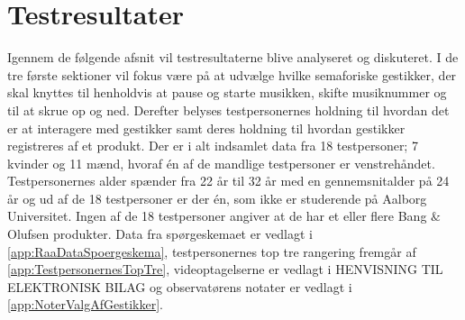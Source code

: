 \chapter{Testresultater}
\label{Testresultater}
%
Igennem de følgende afsnit vil testresultaterne blive analyseret og diskuteret. I de tre første sektioner vil fokus være på at udvælge hvilke semaforiske gestikker, der skal knyttes til henholdvis at pause og starte musikken, skifte musiknummer og til at skrue op og ned. Derefter belyses testpersonernes holdning til hvordan det er at interagere med gestikker samt deres holdning til hvordan gestikker registreres af et produkt.\blankline
%
Der er i alt indsamlet data fra 18 testpersoner; 7 kvinder og 11 mænd, hvoraf én af de mandlige testpersoner er venstrehåndet. Testpersonernes alder spænder fra 22 år til 32 år med en gennemsnitalder på 24 år og ud af de 18 testpersoner er der én, som ikke er studerende på Aalborg Universitet. Ingen af de 18 testpersoner angiver at de har et eller flere Bang $\&$ Olufsen produkter. Data fra spørgeskemaet er vedlagt i \autoref{app:RaaDataSpoergeskema}, testpersonernes top tre rangering fremgår af \autoref{app:TestpersonernesTopTre}, videoptagelserne er vedlagt i HENVISNING TIL ELEKTRONISK BILAG og observatørens notater er vedlagt i \autoref{app:NoterValgAfGestikker}.     